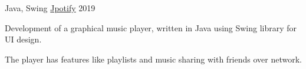 \begin{cventries}

  \cventry
    {Java, Swing} %
    {\href{https://github.com/radinshayanfar/Jpotify}{Jpotify}} %
    {} %
    {2019} %
    {
      \begin{cvitems} %
        \item {Development of a graphical music player, written in Java using Swing library for UI design.}
		\item {The player has features like playlists and music sharing with friends over network.}
      \end{cvitems}
    }


\end{cventries}

